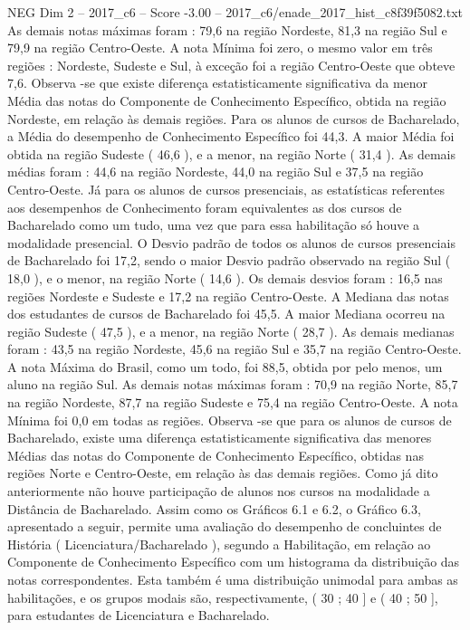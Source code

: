 \begin{textsample}{NEG Dim 2 – 2017\_c6 – Score -3.00 – 2017\_c6/enade\_2017\_hist\_c8f39f5082.txt}
As demais notas máximas foram : 79,6 na região Nordeste, 81,3 na região Sul e 79,9 na região Centro-Oeste.
A nota Mínima foi zero, o mesmo valor em três regiões : Nordeste, Sudeste e Sul, à exceção foi a região Centro-Oeste que obteve 7,6.
Observa -se que existe diferença estatisticamente significativa da menor Média das notas do Componente de Conhecimento Específico, obtida na região Nordeste, em relação às demais regiões.
Para os alunos de cursos de Bacharelado, a Média do desempenho de Conhecimento Específico foi 44,3.
A maior Média foi obtida na região Sudeste ( 46,6 ), e a menor, na região Norte ( 31,4 ).
As demais médias foram : 44,6 na região Nordeste, 44,0 na região Sul e 37,5 na região Centro-Oeste.
Já para os alunos de cursos presenciais, as estatísticas referentes aos desempenhos de Conhecimento foram equivalentes as dos cursos de Bacharelado como um tudo, uma vez que para essa habilitação só houve a modalidade presencial.
O Desvio padrão de todos os alunos de cursos presenciais de Bacharelado foi 17,2, sendo o maior Desvio padrão observado na região Sul ( 18,0 ), e o menor, na região Norte ( 14,6 ).
Os demais desvios foram : 16,5 nas regiões Nordeste e Sudeste e 17,2 na região Centro-Oeste.
A Mediana das notas dos estudantes de cursos de Bacharelado foi 45,5.
A maior Mediana ocorreu na região Sudeste ( 47,5 ), e a menor, na região Norte ( 28,7 ).
As demais medianas foram : 43,5 na região Nordeste, 45,6 na região Sul e 35,7 na região Centro-Oeste.
A nota Máxima do Brasil, como um todo, foi 88,5, obtida por pelo menos, um aluno na região Sul.
As demais notas máximas foram : 70,9 na região Norte, 85,7 na região Nordeste, 87,7 na região Sudeste e 75,4 na região Centro-Oeste.
A nota Mínima foi 0,0 em todas as regiões.
Observa -se que para os alunos de cursos de Bacharelado, existe uma diferença estatisticamente significativa das menores Médias das notas do Componente de Conhecimento Específico, obtidas nas regiões Norte e Centro-Oeste, em relação às das demais regiões.
Como já dito anteriormente não houve participação de alunos nos cursos na modalidade a Distância de Bacharelado.
Assim como os Gráficos 6.1 e 6.2, o Gráfico 6.3, apresentado a seguir, permite uma avaliação do desempenho de concluintes de História ( Licenciatura/Bacharelado ), segundo a Habilitação, em relação ao Componente de Conhecimento Específico com um histograma da distribuição das notas correspondentes.
Esta também é uma distribuição unimodal para ambas as habilitações, e os grupos modais são, respectivamente, ( 30 ; 40 ] e ( 40 ; 50 ], para estudantes de Licenciatura e Bacharelado.

\end{textsample}
